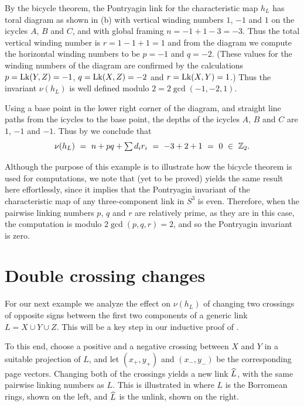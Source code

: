 By the bicycle theorem, the Pontryagin link for the characteristic map $h_L$ has toral diagram as shown in (b) with vertical winding numbers $1$, $-1$ and $1$ on the icycles $A$, $B$ and $C$, and with global framing $n=-1+1-3=-3$.  Thus the total vertical winding number is $r = 1-1+1=1$ and from the diagram we compute the horizontal winding numbers to be $p=-1$ and $q=-2$.  (These values for the winding numbers of the diagram are confirmed by the calculations $p = \mathrm{Lk}(Y,Z)=-1$, $q = \mathrm{Lk}(X,Z)=-2$ and $r = \mathrm{Lk}(X,Y)=1$.)  Thus the invariant $\nu(h_L)$ is well defined modulo $2 = 2\gcd(-1,-2,1)$.

Using a base point in the lower right corner of the diagram, and straight line paths from the icycles to the base point, the depths of the icycles $A$, $B$ and $C$ are $1$, $-1$ and $-1$.  Thus by  we conclude that 
$$
\nu(h_L) \ = \ n+pq + \textstyle\sum d_ir_i \ = \ -3+2+1  \ = \ 0 \ \in \ \bz_2.
$$

Although the purpose of this example is to illustrate how the bicycle theorem is used for computations, we note that  (yet to be proved) yields the same result here effortlessly, since it implies that 
the Pontryagin invariant of the characteristic map of any three-component link in $S^3$ is even.  Therefore, when the pairwise linking numbers $p$, $q$ and $r$ are relatively prime, as they are in this case, the computation is  modulo $2\gcd(p, q, r)  =  2$,  and so the Pontryagin invariant is zero.   

\part{Double crossing changes}

For our next example we analyze the effect on $\nu(h_L)$ of changing two crossings of opposite signs between the first two components of a generic link $L=X\cup Y\cup Z$.  This will be a key step in our inductive proof of .

To this end, choose a positive and a negative crossing between $X$ and $Y$ in a suitable projection of $L$, and let $(x_+,y_+)$ and $(x_-,y_-)$ be the corresponding page vectors.  Changing both of the crossings yields a new link $\widehat{L}$, with the same pairwise linking numbers as $L$.  This is illustrated in  where $L$ is the Borromean rings, shown on the left, and $\widehat{L}$ is the unlink, shown on the right.  

